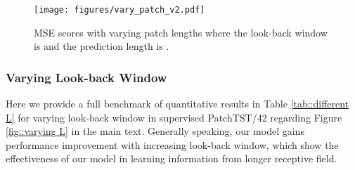 \documentclass{article} \usepackage{iclr2023_conference,times}
\begin{document}
\begin{figure}[!htbp]
\begin{center}
\texttt{[image: figures/vary\_patch\_v2.pdf]}
\end{center}
\caption{MSE scores with varying patch lengths  where the look-back window is  and the prediction length is .}
\label{fig::varying patch len}
\end{figure}


\subsubsection{Varying Look-back Window}

Here we provide a full benchmark of quantitative results in Table \ref{tab::different L} for varying look-back window in supervised PatchTST/42 regarding Figure \ref{fig::varying L} in the main text. Generally speaking, our model gains performance improvement with increasing look-back window, which show the effectiveness of our model in learning information from longer receptive field.
\end{document}
